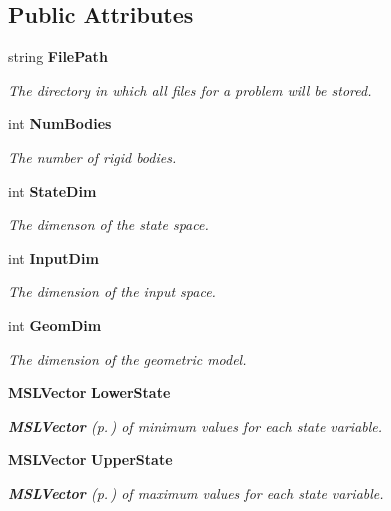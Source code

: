 \subsection*{Public Attributes}
\begin{CompactItemize}
\item 
string {\bf File\-Path}
\begin{CompactList}\small\item\em The directory in which all files for a problem will be stored.\item\end{CompactList}\item 
int {\bf Num\-Bodies}
\begin{CompactList}\small\item\em The number of rigid bodies.\item\end{CompactList}\item 
int {\bf State\-Dim}
\begin{CompactList}\small\item\em The dimenson of the state space.\item\end{CompactList}\item 
int {\bf Input\-Dim}
\begin{CompactList}\small\item\em The dimension of the input space.\item\end{CompactList}\item 
int {\bf Geom\-Dim}
\begin{CompactList}\small\item\em The dimension of the geometric model.\item\end{CompactList}\item 
{\bf MSLVector} {\bf Lower\-State}
\begin{CompactList}\small\item\em {\bf MSLVector} {\rm (p.\,\pageref{class_MSLVector})} of minimum values for each state variable.\item\end{CompactList}\item 
{\bf MSLVector} {\bf Upper\-State}
\begin{CompactList}\small\item\em {\bf MSLVector} {\rm (p.\,\pageref{class_MSLVector})} of maximum values for each state variable.\item\end{CompactList}\item 

\end{CompactItemize}
